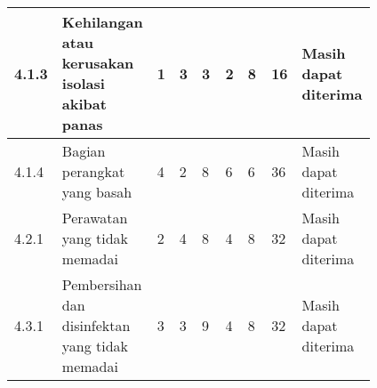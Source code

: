\documentclass[11pt,a4paper,twoside,onecolumn]{book}
\begin{document}
\begin{longtable}{p{0.04\linewidth} p{0.12\linewidth} p{0.05\linewidth} p{0.05\linewidth} p{0.10\linewidth} p{0.05\linewidth} p{0.10\linewidth} p{0.07\linewidth} p{0.23\linewidth}}
		4.1.3 & Kehilangan atau kerusakan isolasi akibat panas &1 &3 &3 &2 &8 &16 & \cellcolor{green} Masih dapat diterima\\ \hline
		4.1.4 & Bagian perangkat yang basah &4 &2 &8 &6 &6 &36 & \cellcolor{yellow} Masih dapat diterima\\ \hline	
		4.2.1 & Perawatan yang tidak memadai &2 &4 &8 &4 &8 &32 & \cellcolor{yellow} Masih dapat diterima\\ \hline	
		4.3.1 & Pembersihan dan disinfektan yang tidak memadai &3 &3 &9 &4 &8 &32 & \cellcolor{yellow} Masih dapat diterima\\ \hline	   	    	  
		 \bottomrule	  
		
		\end{longtable}
		
	\newpage
	
	
\end{document}
